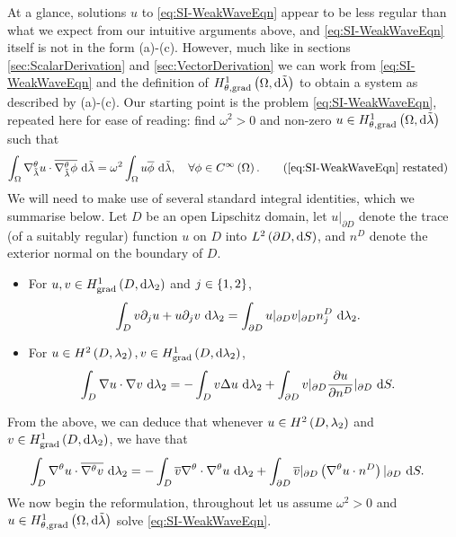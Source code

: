 At a glance, solutions $u$ to \eqref{eq:SI-WeakWaveEqn} appear to be less regular than what we expect from our intuitive arguments above, and \eqref{eq:SI-WeakWaveEqn} itself is not in the form (a)-(c).
However, much like in sections \ref{sec:ScalarDerivation} and \ref{sec:VectorDerivation} we can work from \eqref{eq:SI-WeakWaveEqn} and the definition of $H^1_{\theta, \mathrm{grad}}\left( \Omega, \mathrm{d}\tilde{\lambda} \right)$ to obtain a system as described by (a)-(c).
Our starting point is the problem \eqref{eq:SI-WeakWaveEqn}, repeated here for ease of reading: find $\omega^2>0$ and non-zero $u\in H^1_{\theta, \mathrm{grad}}\left( \Omega, \mathrm{d}\tilde{\lambda} \right)$ such that
\begin{align*}
	\integral{\ddom}{ \tgrad_{\compMes}u\cdot\overline{\tgrad_{\compMes}\phi} }{\compMes}
	&= \omega^2 \integral{\ddom}{ u\overline{\phi} }{\compMes}, \quad\forall\phi\in\smooth{\ddom}. \tag{\eqref{eq:SI-WeakWaveEqn} restated}
\end{align*}
We will need to make use of several standard integral identities, which we summarise below.
Let $D$ be an open Lipschitz domain, let $u\vert_{\partial D}$ denote the trace (of a suitably regular) function $u$ on $D$ into $L^{2}\left( \partial D,\mathrm{d}S \right)$, and $n^D$ denote the exterior normal on the boundary of $D$.
\begin{itemize}
	\item For $u,v\in H^1_\mathrm{grad}\left( D, \mathrm{d}\lambda_2 \right)$ and $j\in\left\{ 1,2 \right\}$,
	\begin{align*}
		\int_{D} v\partial_j u + u\partial_j v  \ \mathrm{d}\lambda_2
		&= \int_{\partial D} u\vert_{\partial D}v\vert_{\partial D}n^D_j  \ \mathrm{d}\lambda_2.
	\end{align*}
	\item For $u\in H^2\left( D,\lambda_2 \right), v\in H^1_\mathrm{grad}\left( D, \mathrm{d}\lambda_2 \right)$,
	\begin{align*}
		\int_{D} \nabla u\cdot \nabla v  \ \mathrm{d}\lambda_2 
		&=  - \int_{D} v\Delta u  \ \mathrm{d}\lambda_2 + \int_{\partial D} v\vert_{\partial D}\dfrac{\partial u}{\partial n^D}\vert_{\partial D}  \ \mathrm{d}S.
	\end{align*}
\end{itemize}
From the above, we can deduce that whenever $u\in H^2\left( D,\lambda_2 \right)$ and $v\in H^1_\mathrm{grad}\left( D, \mathrm{d}\lambda_2 \right)$, we have that
\begin{align*}
	\int_{D} \nabla^{\theta} u\cdot\overline{\nabla^{\theta} v}  \ \mathrm{d}\lambda_2
	&= - \int_{D} \overline{v}\nabla^{\theta}\cdot\nabla^{\theta} u  \ \mathrm{d}\lambda_2 + \int_{\partial D} \overline{v}\vert_{\partial D}\left( \nabla^{\theta} u\cdot n^D \right)\vert_{\partial D}  \ \mathrm{d}S.
\end{align*}
We now begin the reformulation, throughout let us assume $\omega^2>0$ and $u\in H^1_{\theta, \mathrm{grad}}\left( \Omega, \mathrm{d}\tilde{\lambda} \right)$ solve \eqref{eq:SI-WeakWaveEqn}.

